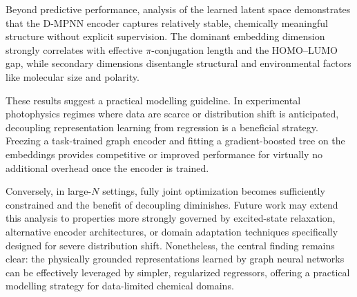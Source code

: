 Beyond predictive performance, analysis of the learned latent space demonstrates that the D-MPNN encoder captures relatively stable, chemically meaningful structure without explicit supervision. The dominant embedding dimension strongly correlates with effective $\pi$-conjugation length and the HOMO--LUMO gap, while secondary dimensions disentangle structural and environmental factors like molecular size and polarity.

These results suggest a practical modelling guideline. In experimental photophysics regimes where data are scarce or distribution shift is anticipated, decoupling representation learning from regression is a beneficial strategy. Freezing a task-trained graph encoder and fitting a gradient-boosted tree on the embeddings provides competitive or improved performance for virtually no additional overhead once the encoder is trained. 

Conversely, in large-$N$ settings, fully joint optimization becomes sufficiently constrained and the benefit of decoupling diminishes. Future work may extend this analysis to properties more strongly governed by excited-state relaxation, alternative encoder architectures, or domain adaptation techniques specifically designed for severe distribution shift. Nonetheless, the central finding remains clear: the physically grounded representations learned by graph neural networks can be effectively leveraged by simpler, regularized regressors, offering a practical modelling strategy for data-limited chemical domains.